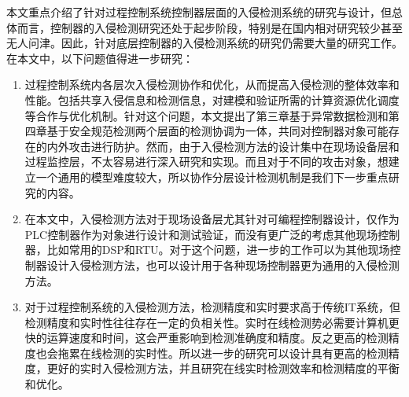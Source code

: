 本文重点介绍了针对过程控制系统控制器层面的入侵检测系统的研究与设计，但总体而言，控制器的入侵检测研究还处于起步阶段，特别是在国内相对研究较少甚至无人问津。因此，针对底层控制器的入侵检测系统的研究仍需要大量的研究工作。在本文中，以下问题值得进一步研究：
\begin{enumerate}
\item 过程控制系统内各层次入侵检​​测协作和优化，从而提高入侵检测的整体效率和性能。包括共享入侵信息和检测信息，对建模和验证所需的计算资源优化调度等合作与优化机制。针对这个问题，本文提出了第三章基于异常数据检测和第四章基于安全规范检测两个层面的检测协调为一体，共同对控制器对象可能存在的内外攻击进行防护。然而，由于入侵检测方法的设计集中在现场设备层和过程监控层，不太容易进行深入研究和实现。而且对于不同的攻击对象，想建立一个通用的模型难度较大，所以协作分层设计检测机制是我们下一步重点研究的内容。
\item 在本文中，入侵检测方法对于现场设备层尤其针对可编程控制器设计，仅作为PLC控制器作为对象进行设计和测试验证，而没有更广泛的考虑其他现场控制器，比如常用的DSP和RTU。对于这个问题，进一步的工作可以为其他现场控制器设计入侵检测方法，也可以设计用于各种现场控制器更为通用的入侵检测方法。
\item 对于过程控制系统的入侵检测方法，检测精度和实时要求高于传统IT系统，但检测精度和实时性往往存在一定的负相关性。实时在线检测势必需要计算机更快的运算速度和时间，这会严重影响到检测准确度和精度。反之更高的检测精度也会拖累在线检测的实时性。所以进一步的研究可以设计具有更高的检测精度，更好的实时入侵检测方法，并且研究在线实时检测效率和检测精度的平衡和优化。
\end{enumerate}



